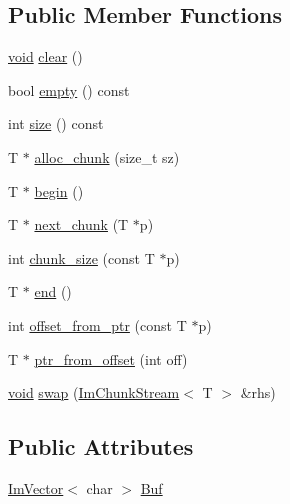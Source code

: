 \subsection*{Public Member Functions}
\begin{DoxyCompactItemize}
\item 
\hyperlink{imgui__impl__opengl3__loader_8h_ac668e7cffd9e2e9cfee428b9b2f34fa7}{void} \hyperlink{structImChunkStream_a3bf3babbba7a8edafce99be0589379a3}{clear} ()
\item 
bool \hyperlink{structImChunkStream_aef1d3eeb4c1aa2980da6a14ae96d2499}{empty} () const
\item 
int \hyperlink{structImChunkStream_a0454c7345104dad27a52828584765edb}{size} () const
\item 
T $\ast$ \hyperlink{structImChunkStream_abe839ee96b7507850073541509998d1f}{alloc\+\_\+chunk} (size\+\_\+t sz)
\item 
T $\ast$ \hyperlink{structImChunkStream_a7cf0b26462edf55fba30b1a32de10117}{begin} ()
\item 
T $\ast$ \hyperlink{structImChunkStream_a279ef3799a73ef047ca26a55aefb726e}{next\+\_\+chunk} (T $\ast$p)
\item 
int \hyperlink{structImChunkStream_a1a83609aaee47cf8b59a8ae09a04a06b}{chunk\+\_\+size} (const T $\ast$p)
\item 
T $\ast$ \hyperlink{structImChunkStream_a4dd3a6cf7c30406b0fe1ee5e99ab2084}{end} ()
\item 
int \hyperlink{structImChunkStream_ab3dccb857d0b35ae295d14ff7f9dd0ac}{offset\+\_\+from\+\_\+ptr} (const T $\ast$p)
\item 
T $\ast$ \hyperlink{structImChunkStream_a88e60ac2db2c90e8bccff3b48a2a03b3}{ptr\+\_\+from\+\_\+offset} (int off)
\item 
\hyperlink{imgui__impl__opengl3__loader_8h_ac668e7cffd9e2e9cfee428b9b2f34fa7}{void} \hyperlink{structImChunkStream_adbd734ea08939c0bce519e90b26c9d28}{swap} (\hyperlink{structImChunkStream}{Im\+Chunk\+Stream}$<$ T $>$ \&rhs)
\end{DoxyCompactItemize}
\subsection*{Public Attributes}
\begin{DoxyCompactItemize}
\item 
\hyperlink{structImVector}{Im\+Vector}$<$ char $>$ \hyperlink{structImChunkStream_ac6036044bd7eae552342b430527cc620}{Buf}
\end{DoxyCompactItemize}


